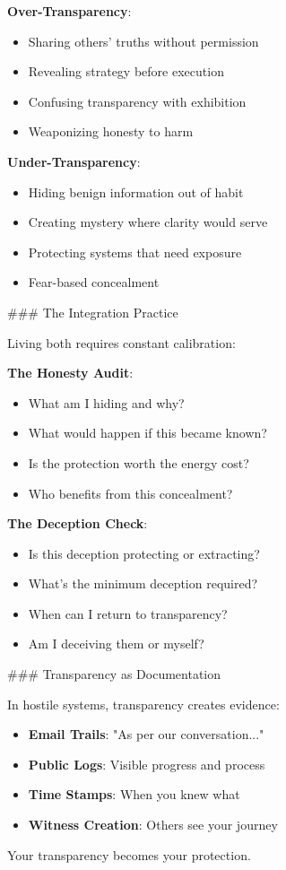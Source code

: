 \documentclass[12pt]{book}
\begin{document}
\textbf{Over-Transparency}:
\begin{itemize}
\item Sharing others' truths without permission
\item Revealing strategy before execution
\item Confusing transparency with exhibition
\item Weaponizing honesty to harm

\end{itemize}
\textbf{Under-Transparency}:
\begin{itemize}
\item Hiding benign information out of habit
\item Creating mystery where clarity would serve
\item Protecting systems that need exposure
\item Fear-based concealment

\end{itemize}
\#\#\# The Integration Practice

Living both requires constant calibration:

\textbf{The Honesty Audit}:
\begin{itemize}
\item What am I hiding and why?
\item What would happen if this became known?
\item Is the protection worth the energy cost?
\item Who benefits from this concealment?

\end{itemize}
\textbf{The Deception Check}:
\begin{itemize}
\item Is this deception protecting or extracting?
\item What's the minimum deception required?
\item When can I return to transparency?
\item Am I deceiving them or myself?

\end{itemize}
\#\#\# Transparency as Documentation

In hostile systems, transparency creates evidence:

\begin{itemize}
\item \textbf{Email Trails}: "As per our conversation..."
\item \textbf{Public Logs}: Visible progress and process
\item \textbf{Time Stamps}: When you knew what
\item \textbf{Witness Creation}: Others see your journey

\end{itemize}
Your transparency becomes your protection.
\end{document}
